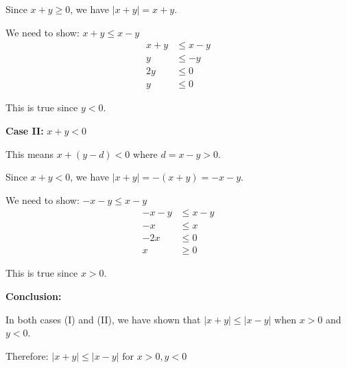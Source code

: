 Since $x + y \geq 0$, we have $|x + y| = x + y$.

We need to show: $x + y \leq x - y$
\begin{align}
x + y &\leq x - y \\
y &\leq -y \\
2y &\leq 0 \\
y &\leq 0
\end{align}

This is true since $y < 0$.

\vspace{1em}

\textbf{Case II:} $x + y < 0$

This means $x + (y - d) < 0$ where $d = x - y > 0$.

Since $x + y < 0$, we have $|x + y| = -(x + y) = -x - y$.

We need to show: $-x - y \leq x - y$
\begin{align}
-x - y &\leq x - y \\
-x &\leq x \\
-2x &\leq 0 \\
x &\geq 0
\end{align}

This is true since $x > 0$.

\vspace{1em}

\textbf{Conclusion:}

In both cases (I) and (II), we have shown that $|x + y| \leq |x - y|$ when $x > 0$ and $y < 0$.

Therefore: $\boxed{|x + y| \leq |x - y| \text{ for } x > 0, y < 0}$